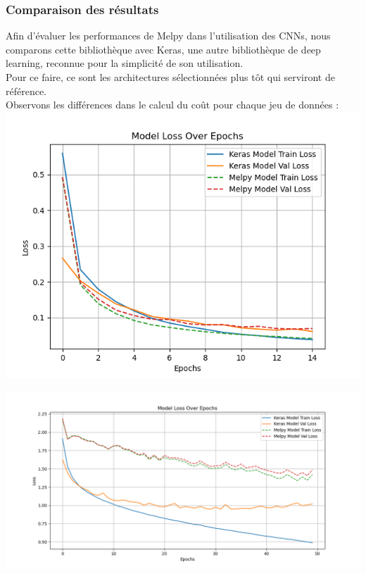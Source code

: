 \begin{multicols}{2}
\subsubsection{Comparaison des résultats}

Afin d’évaluer les performances de Melpy dans l’utilisation des CNNs, nous comparons cette bibliothèque avec Keras, une autre bibliothèque de deep learning, reconnue pour la simplicité de son utilisation. \\

Pour ce faire, ce sont les architectures sélectionnées plus tôt qui serviront de référence.\\

Observons les différences dans le calcul du coût pour chaque jeu de données : \\

\includegraphics[width=\columnwidth]{images/mnist_loss_comparison.png}
\hfill\break


\includegraphics[width=\columnwidth]{images/cifar10_loss_comparison.png}
\hfill\break


\end{multicols}
